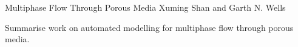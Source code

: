               {Multiphase Flow Through Porous Media}
              {Xuming Shan and Garth N. Wells}

\editornote{[shan]}

Summarise work on automated modelling for multiphase flow through porous media.
